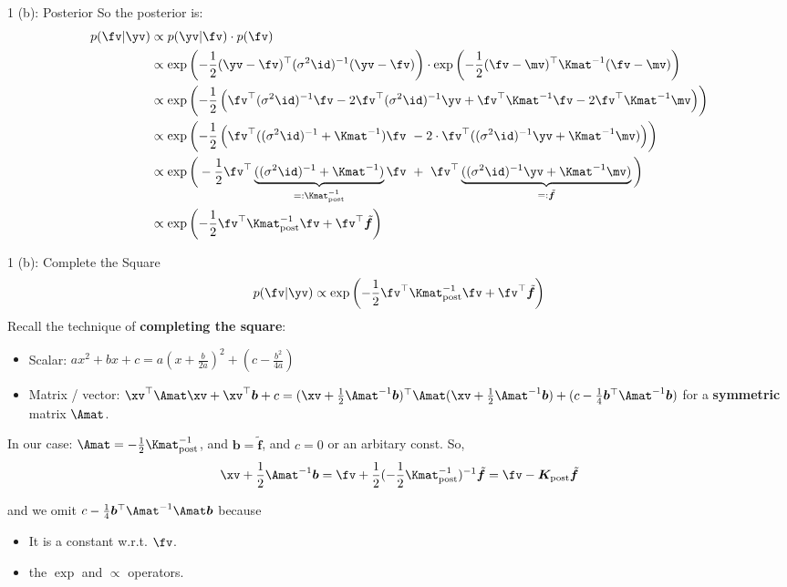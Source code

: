 \documentclass[aspectratio=169]{beamer}
\newcommand{\ssqiinv}{(\sigma^2 \id)^{-1}}
\newcommand{\kinv}{\Kmat^{-1}}
\newcommand{\kpinv}{\Kmat_{\text{post}}^{-1}}
\newcommand{\tfv}{\tilde{\bm{f}}}
\newcommand{\bv}{\bm{b}}
\newcommand{\Kpost}{\bm{K}_{\text{post}}}
\begin{document}
\begin{frame}{1 (b): Posterior}
\small
	So the posterior is:
\begin{align*}
	p(\fv | \yv) & \propto p(\yv | \fv) \cdot p(\fv) \\
	&\propto \exp\left( -\frac{1}{2} (\yv - \fv)^\top (\sigma^2 \id)^{-1} (\yv - \fv) \right) \cdot \exp\left( - \frac{1}{2}(\fv - \mv)^\top \Kmat^{-1} (\fv - \mv) \right) \\
	&\propto \exp \left( -\frac{1}{2} \left(  \fv^\top \ssqiinv\fv - 2 \fv^\top \ssqiinv \yv + \fv^\top \kinv \fv - 2 \fv^\top \kinv \mv \right) \right) \\
	&\propto \exp \left( -\frac{1}{2} \left( \fv^\top (\ssqiinv + \kinv) \fv \  -2\cdot  \fv^\top (\ssqiinv \yv + \kinv \mv) \right) \right) \\
	& \propto \exp \bigg( -\frac{1}{2}\fv^\top \underbrace{(\ssqiinv + \kinv)}_{=: \kpinv} \fv \ + \ \fv^\top \underbrace{(\ssqiinv \yv + \kinv \mv)}_{=:\tfv}  \bigg) \\
	&\propto \exp \left( - \frac{1}{2} \fv^\top \kpinv \fv + \fv^\top \tfv \right)
\end{align*}
\end{frame}

\begin{frame}{1 (b): Complete the Square}
\small
	\begin{align*}
		p(\fv | \yv) &\propto \exp \left( - \frac{1}{2} \fv^\top \kpinv \fv + \fv^\top \tfv \right) \\
	\end{align*}
	Recall the technique of \textbf{completing the square}: 
	\begin{itemize}
		\item Scalar: $a x^2 + b x + c = a(x + \frac{b}{2a})^2 + (c - \frac{b^2}{4a})$
		\item Matrix / vector: $\xv^\top \Amat \xv + \xv^\top \bv +c = (\xv + \frac{1}{2} \Amat^{-1} \bv)^\top \Amat (\xv + \frac{1}{2} \Amat^{-1} \bv) + (c - \frac{1}{4} \bv^\top \Amat^{-1} \bv)$ for a \textbf{symmetric} matrix $\Amat$.
	\end{itemize}
	In our case: $\Amat = -\frac{1}{2} \kpinv$, and $\bv = \tfv$, and $c=0$ or an arbitary const. So, 
	$$\xv + \frac{1}{2} \Amat^{-1} \bv = \fv + \frac{1}{2}(-\frac{1}{2} \kpinv)^{-1} \tfv = \fv - \Kpost \tfv$$
	
	and we omit $c - \frac{1}{4} \bv^\top \Amat^{-1}\Amat \bv $ because
	\begin{itemize}
		\item It is a constant w.r.t. $\fv$.
		\item the $\exp$ and $\propto$ operators.
	\end{itemize}
\end{frame}
\end{document}
